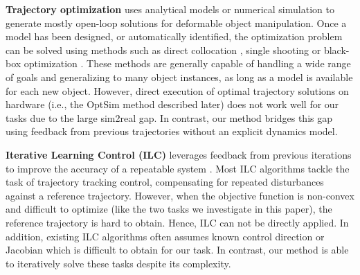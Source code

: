 \textbf{Trajectory optimization} uses analytical models \cite{fast_hand} or numerical simulation \cite{peter_model,bio_whip,optimal_planning,trajopt_berkeley,japan_rope} to generate mostly open-loop solutions for deformable object manipulation. Once a model has been designed, or automatically identified\cite{japan_rope}, the optimization problem can be solved using methods such as direct collocation \cite{trajopt_berkeley}, single shooting \cite{peter_model} or black-box optimization \cite{bio_whip}. These methods are generally capable of handling a wide range of goals and generalizing to many object instances, as long as a model is available for each new object. However, direct execution of optimal trajectory solutions on hardware (i.e., the OptSim method described later) does not work well for our tasks due to the large sim2real gap. In contrast, our method bridges this gap using feedback from previous trajectories without an explicit dynamics model.

\textbf{Iterative Learning Control (ILC)} leverages feedback from previous iterations to improve the accuracy of a repeatable system \cite{ilc_book, ilc_survey}. Most ILC algorithms tackle the task of trajectory tracking control, compensating for repeated disturbances against a reference trajectory. 
However, when the objective function is non-convex and difficult to optimize (like the two tasks we investigate in this paper), the reference trajectory is hard to obtain. Hence, ILC can not be directly applied.
In addition, existing ILC algorithms often assumes known control direction or Jacobian which is difficult to obtain for our task. In contrast, our method is able to iteratively solve these tasks despite its complexity.
